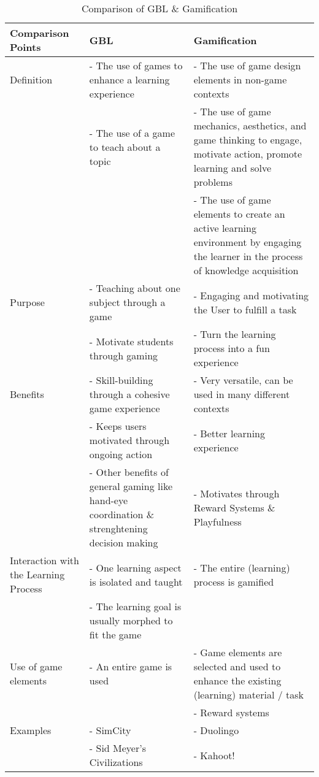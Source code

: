 \renewcommand{\arraystretch}{1.5}
\begin{table}[h]
\centering
\tiny
\begin{tabular}{ |p{3cm}||p{4.5cm}|p{4.5cm}|  }
\hline
\textbf{Comparison Points}& \textbf{GBL} & \textbf{Gamification}\\
\hline
Definition & - The use of games to enhance a learning experience & - The use of game design elements in non-game contexts \\
& - The use of a game to teach about a topic & - The use of game mechanics, aesthetics, and game thinking to engage, motivate action, promote learning and solve problems \\
& & - The use of game elements to create an active learning environment by engaging the learner in the process of knowledge acquisition \\
\hline
Purpose & - Teaching about one subject through a game & - Engaging and motivating the User to fulfill a task \\
& - Motivate students through gaming & - Turn the learning process into a fun experience \\
\hline
Benefits & - Skill-building through a cohesive game experience & - Very versatile, can be used in many different contexts \\
& - Keeps users motivated through ongoing action & - Better learning experience \\
& - Other benefits of general gaming like hand-eye coordination \& strenghtening decision making & - Motivates through Reward Systems \& Playfulness \\
\hline
Interaction with the Learning Process & - One learning aspect is isolated and taught & - The entire (learning) process is gamified \\
& - The learning goal is usually morphed to fit the game & \\
\hline
Use of game elements & - An entire game is used & - Game elements are selected and used to enhance the existing (learning) material / task \\
& & - Reward systems \\
\hline
Examples & - SimCity & - Duolingo \\
& - Sid Meyer's Civilizations & - Kahoot! \\
\hline
\end{tabular}
\caption{Comparison of GBL \& Gamification}
\label{table:1}
\end{table}